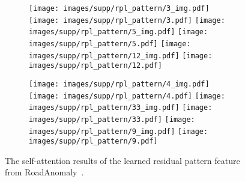 \documentclass[10pt,twocolumn,letterpaper]{article}
\begin{document}
\begin{figure*}
\begin{subfigure}[b]{0.49\linewidth}
    \centering
    \texttt{[image: images/supp/rpl\_pattern/3\_img.pdf]} \hfill
    \texttt{[image: images/supp/rpl\_pattern/3.pdf]} 
        \texttt{[image: images/supp/rpl\_pattern/5\_img.pdf]} \hfill
    \texttt{[image: images/supp/rpl\_pattern/5.pdf]} 
    \texttt{[image: images/supp/rpl\_pattern/12\_img.pdf]} \hfill
    \texttt{[image: images/supp/rpl\_pattern/12.pdf]} 
\end{subfigure}
\begin{subfigure}[b]{0.49\linewidth}
    \centering
    \texttt{[image: images/supp/rpl\_pattern/4\_img.pdf]} \hfill
    \texttt{[image: images/supp/rpl\_pattern/4.pdf]} 
    \texttt{[image: images/supp/rpl\_pattern/33\_img.pdf]} \hfill
    \texttt{[image: images/supp/rpl\_pattern/33.pdf]}  
    \texttt{[image: images/supp/rpl\_pattern/9\_img.pdf]} \hfill
    \texttt{[image: images/supp/rpl\_pattern/9.pdf]} 
\end{subfigure}
\vspace{-5pt}
\caption{The self-attention results of the learned residual pattern feature from RoadAnomaly~\cite{lis2019detecting}.}
\vspace{-15pt}
\label{fig:rpl}
\end{figure*}
\end{document}
